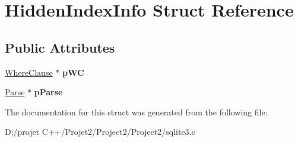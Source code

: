 \hypertarget{struct_hidden_index_info}{}\section{Hidden\+Index\+Info Struct Reference}
\label{struct_hidden_index_info}
\subsection*{Public Attributes}
\begin{DoxyCompactItemize}
\item 
\mbox{\label{struct_hidden_index_info_adb5370f1011f7a754e8cd88913147f24}} 
\mbox{\hyperlink{struct_where_clause}{Where\+Clause}} $\ast$ {\bfseries p\+WC}
\item 
\mbox{\label{struct_hidden_index_info_a2a9e6e808d13c30cfba3e97e3729e8f5}} 
\mbox{\hyperlink{struct_parse}{Parse}} $\ast$ {\bfseries p\+Parse}
\end{DoxyCompactItemize}


The documentation for this struct was generated from the following file\+:\begin{DoxyCompactItemize}
\item 
D\+:/projet C++/\+Projet2/\+Project2/\+Project2/sqlite3.\+c\end{DoxyCompactItemize}
